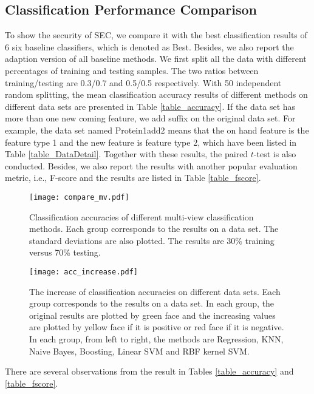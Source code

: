 \documentclass[10pt,journal,compsoc]{IEEEtran}
\begin{document}
\subsection{Classification Performance Comparison}

To show the security of SEC, we compare it with the best classification results of 6 six baseline classifiers, which is denoted as Best. Besides, we also report the adaption version of all baseline methods. We first split all the data with different percentages of training and testing samples. The two ratios between training/testing are 0.3/0.7 and 0.5/0.5 respectively. With 50 independent random splitting, the mean classification accuracy results
of different methods on different data sets are presented in Table \ref{table_accuracy}. If the data set has more than one new coming feature, we add suffix on the original data set. For example, the data set named Protein1add2 means that the on hand feature is the feature type 1 and the new feature is feature type 2, which have been listed in Table \ref{table_DataDetail}. Together with these results, the paired $t$-test is also conducted. Besides, we also report the results with another popular evaluation metric, i.e., F-score and the results are listed in Table \ref{table_fscore}.

\begin{figure*}[!t]
\centering
\texttt{[image: compare\_mv.pdf]}
\caption{Classification accuracies of different multi-view classification methods. Each group corresponds to the results on a data set. The standard deviations are also plotted. The results are 30\% training versus 70\% testing.}
\label{fig3}
\vskip -0.1in
\end{figure*}

\begin{figure*}[!t]
\centering
\texttt{[image: acc\_increase.pdf]}
\caption{The increase of classification accuracies on different data sets. Each group corresponds to the results on a data set. In each group, the original results are plotted by green face and the increasing values are plotted by yellow face if it is positive or red face if it is negative. In each group, from left to right, the methods are Regression, KNN, Naive Bayes, Boosting, Linear SVM and RBF kernel SVM.}
\label{fig4}
\vskip -0.1in
\end{figure*}

There are several observations from the result in Tables \ref{table_accuracy} and \ref{table_fscore}.
\end{document}
